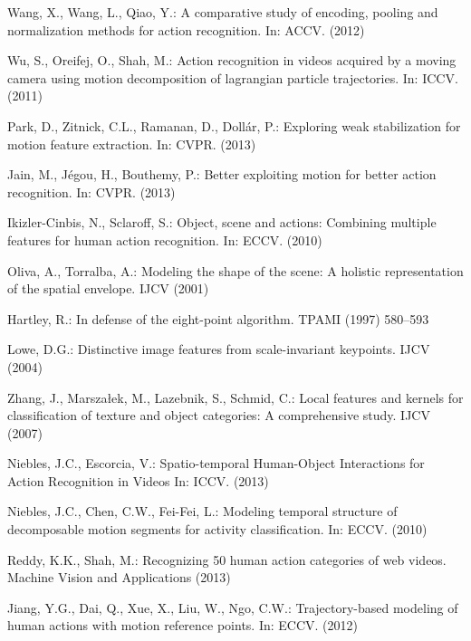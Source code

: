 \documentclass[runningheads]{llncs}
\begin{document}
\begin{thebibliography}{10}
Wang, X., Wang, L., Qiao, Y.:
\newblock A comparative study of encoding, pooling and normalization methods
  for action recognition.
\newblock In: ACCV.
\newblock (2012)

Wu, S., Oreifej, O., Shah, M.:
\newblock Action recognition in videos acquired by a moving camera using motion
  decomposition of lagrangian particle trajectories.
\newblock In: ICCV. (2011)

Park, D., Zitnick, C.L., Ramanan, D., Doll{\'a}r, P.:
\newblock Exploring weak stabilization for motion feature extraction.
\newblock In: CVPR. (2013)

Jain, M., J{\'e}gou, H., Bouthemy, P.:
\newblock Better exploiting motion for better action recognition.
\newblock In: CVPR. (2013)

Ikizler-Cinbis, N., Sclaroff, S.:
\newblock Object, scene and actions: Combining multiple features for human
  action recognition.
\newblock In: ECCV.
\newblock (2010)

Oliva, A., Torralba, A.:
\newblock Modeling the shape of the scene: A holistic representation of the
  spatial envelope.
\newblock IJCV (2001)

Hartley, R.:
\newblock In defense of the eight-point algorithm.
\newblock TPAMI (1997)  580--593

Lowe, D.G.:
\newblock Distinctive image features from scale-invariant keypoints.
\newblock IJCV (2004)

Zhang, J., Marsza{\l}ek, M., Lazebnik, S., Schmid, C.:
\newblock Local features and kernels for classification of texture and object
  categories: A comprehensive study.
\newblock IJCV (2007)

Niebles, J.C., Escorcia, V.:
\newblock Spatio-temporal Human-Object Interactions for Action Recognition in Videos
\newblock In: ICCV.
\newblock (2013)

Niebles, J.C., Chen, C.W., Fei-Fei, L.:
\newblock Modeling temporal structure of decomposable motion segments for
  activity classification.
\newblock In: ECCV.
\newblock (2010)

Reddy, K.K., Shah, M.:
\newblock Recognizing 50 human action categories of web videos.
\newblock Machine Vision and Applications (2013)

Jiang, Y.G., Dai, Q., Xue, X., Liu, W., Ngo, C.W.:
\newblock Trajectory-based modeling of human actions with motion reference
  points.
\newblock In: ECCV.
\newblock (2012)

\end{thebibliography}


\end{document}
